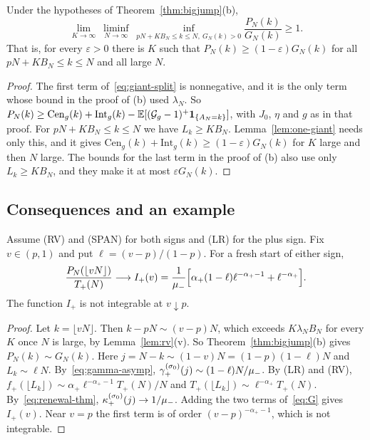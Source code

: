 \begin{corollary}\label{cor:bigjump-lower}
Under the hypotheses of Theorem~\ref{thm:bigjump}(b),
\[
 \lim_{K\to\infty}\ \liminf_{N\to\infty}\ \inf_{pN+KB_N\le k\le N,\ G_N(k)>0}
 \frac{P_N(k)}{G_N(k)}\ge1 .
\]
That is, for every $\varepsilon>0$ there is $K$ such that
$P_N(k)\ge(1-\varepsilon)G_N(k)$ for all $pN+KB_N\le k\le N$ and all large $N$.
\end{corollary}

\begin{proof}
The first term of~\eqref{eq:giant-split} is nonnegative, and it is the only term
whose bound in the proof of (b) used $\lambda_N$. So
$P_N(k)\ge\mathrm{Cen}_g(k)+\mathrm{Int}_g(k)-\mathbb{E}[(\mathcal G_g-1)^+\mathbf{1}_{\{A_N=k\}}]$,
with $J_0$, $\eta$ and $g$ as in that proof. For $pN+KB_N\le k\le N$ we have
$L_k\ge KB_N$. Lemma~\ref{lem:one-giant} needs only this, and it gives
$\mathrm{Cen}_g(k)+\mathrm{Int}_g(k)\ge(1-\varepsilon)G_N(k)$ for $K$ large and then $N$
large. The bounds for the last term in the proof of (b) also use only $L_k\ge KB_N$,
and they make it at most $\varepsilon G_N(k)$.
\end{proof}

\subsection{Consequences and an example}\label{sec:bigjump-consequences}

\begin{corollary}\label{cor:infinite-density}
Assume (RV) and (SPAN) for both signs and (LR) for the plus sign. Fix $v\in(p,1)$
and put $\ell=(v-p)/(1-p)$. For a fresh start of either sign,
\[
 \frac{P_N(\lfloor vN\rfloor)}{T_{+}(N)}\longrightarrow
 I_{+}(v)=\frac1{\mu_{-}}\Bigl[\alpha_{+}(1-\ell)\ell^{-\alpha_{+}-1}+\ell^{-\alpha_{+}}\Bigr].
\]
The function $I_\plus$ is not integrable at $v\downarrow p$.
\end{corollary}

\begin{proof}
Let $k=\lfloor vN\rfloor$. Then $k-pN\sim(v-p)N$, which exceeds $K\lambda_NB_N$ for
every $K$ once $N$ is large, by Lemma~\ref{lem:rv}(v). So Theorem~\ref{thm:bigjump}(b)
gives $P_N(k)\sim G_N(k)$. Here $j=N-k\sim(1-v)N=(1-p)(1-\ell)N$ and $L_k\sim\ell N$.
By~\eqref{eq:gamma-asymp}, $\gamma^{(\sigma_0)}_{+}(j)\sim(1-\ell)N/\mu_{-}$. By (LR) and (RV),
$f_\plus(\lfloor L_k\rfloor)\sim\alpha_\plus\ell^{-\alpha_\plus-1}T_\plus(N)/N$ and
$T_\plus(\lfloor L_k\rfloor)\sim\ell^{-\alpha_\plus}T_\plus(N)$. By~\eqref{eq:renewal-thm},
$\kappa^{(\sigma_0)}_{+}(j)\to1/\mu_{-}$. Adding the two terms of~\eqref{eq:G} gives
$I_\plus(v)$. Near $v=p$ the first term is of order $(v-p)^{-\alpha_\plus-1}$, which
is not integrable.
\end{proof}

